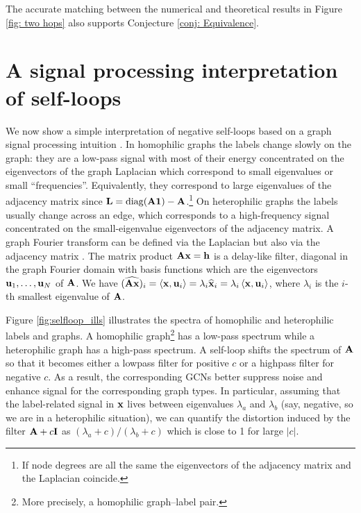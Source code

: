 \documentclass[9pt,twocolumn]{pnas-new}
\begin{document}
The accurate matching between the numerical and theoretical results in Figure \ref{fig: two hops} also supports Conjecture \ref{conj: Equivalence}.





\section{A signal processing interpretation of self-loops} \label{APP: selfloops and sp}


We now show a simple interpretation of negative self-loops based on a graph signal processing intuition \cite{shuman2013emerging, ortega2018graph}. In homophilic graphs the labels change slowly on the graph: they are a low-pass signal \cite{ortega2018graph, chien2021adaptive} with most of their energy concentrated on the eigenvectors of the graph Laplacian which correspond to small eigenvalues or small ``frequencies''. Equivalently, they correspond to large eigenvalues of the adjacency matrix since $\mathbf{L} = \mathop{\mathrm{diag}}(\mathbf{A} \mathbf{1}) - \mathbf{A}$.\footnote{If node degrees are all the same the eigenvectors of the adjacency matrix and the Laplacian coincide.} On heterophilic graphs the labels usually change across an edge, which corresponds to a high-frequency signal concentrated on the small-eigenvalue eigenvectors of the adjacency matrix. A graph Fourier transform can be defined via the Laplacian but also via the adjacency matrix \cite{ortega2018graph}. The matrix product $\mathbf{A}\mathbf{x}=\mathbf{h}$ is a delay-like filter, diagonal in the graph Fourier domain with basis functions which are the eigenvectors $\mathbf{u}_1, \ldots, \mathbf{u}_N$ of $\mathbf{A}$. We have $(\widehat{\mathbf{A} \mathbf{x}})_i = \left\langle\mathbf{x}, \mathbf{u}_i\right\rangle = \lambda_i \widehat{\mathbf{x}}_i = \lambda_i \left\langle\mathbf{x}, \mathbf{u}_i\right\rangle$, where $\lambda_i$ is the $i$-th smallest eigenvalue of $\mathbf{A}$.  

Figure \ref{fig:selfloop_ills} illustrates the spectra of homophilic and heterophilic labels and graphs. A homophilic graph\footnote{More precisely, a homophilic graph--label pair.} has a low-pass spectrum while a heterophilic graph has a high-pass spectrum. A self-loop shifts the spectrum of $\mathbf{A}$ so that it becomes either a lowpass filter for positive $c$ or a highpass filter for negative $c$. As a result, the corresponding GCNs better suppress noise and enhance signal for the corresponding graph types. In particular, assuming that the label-related signal in $\mathbf{x}$ lives between eigenvalues $\lambda_a$ and $\lambda_b$ (say, negative, so we are in a heterophilic situation), we can quantify the distortion induced by the filter $\mathbf{A} + c\mathbf{I}$ as ${(\lambda_a + c)}/{(\lambda_b + c)}$ which is close to 1 for large $|c|$.
\end{document}
